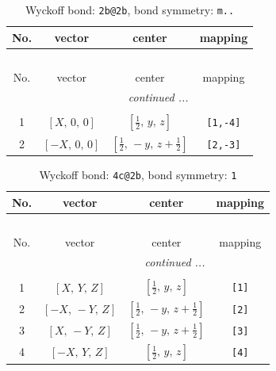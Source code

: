 \documentclass[fleqn,8pt]{jsarticle}
\begin{document}
\renewcommand{\arraystretch}{1.2}
\begin{longtable}{cccc}
\caption{Wyckoff bond: {\tt 2b@2b}, bond symmetry: {\tt m..}}
 \\
 \hline \hline
No. & vector & center & mapping \\ \hline \endfirsthead

\multicolumn{3}{l}{\tablename\ \thetable{}} \\
 \hline \hline
No. & vector & center & mapping \\ \hline \endhead

 \hline \hline
\multicolumn{3}{r}{\footnotesize\it continued ...} \\ \endfoot

 \hline \hline
\multicolumn{3}{r}{} \\ \endlastfoot

1 & $\left[ X,\, 0,\, 0 \right]$ & $\left[ \frac{1}{2},\, y,\, z \right]$ & {\tt [1,-4]} \\ \hline
2 & $\left[ - X,\, 0,\, 0 \right]$ & $\left[ \frac{1}{2},\, - y,\, z + \frac{1}{2} \right]$ & {\tt [2,-3]} \\
\end{longtable}
\renewcommand{\arraystretch}{1.2}
\begin{longtable}{cccc}
\caption{Wyckoff bond: {\tt 4c@2b}, bond symmetry: {\tt 1}}
 \\
 \hline \hline
No. & vector & center & mapping \\ \hline \endfirsthead

\multicolumn{3}{l}{\tablename\ \thetable{}} \\
 \hline \hline
No. & vector & center & mapping \\ \hline \endhead

 \hline \hline
\multicolumn{3}{r}{\footnotesize\it continued ...} \\ \endfoot

 \hline \hline
\multicolumn{3}{r}{} \\ \endlastfoot

1 & $\left[ X,\, Y,\, Z \right]$ & $\left[ \frac{1}{2},\, y,\, z \right]$ & {\tt [1]} \\ \hline
2 & $\left[ - X,\, - Y,\, Z \right]$ & $\left[ \frac{1}{2},\, - y,\, z + \frac{1}{2} \right]$ & {\tt [2]} \\ \hline
3 & $\left[ X,\, - Y,\, Z \right]$ & $\left[ \frac{1}{2},\, - y,\, z + \frac{1}{2} \right]$ & {\tt [3]} \\ \hline
4 & $\left[ - X,\, Y,\, Z \right]$ & $\left[ \frac{1}{2},\, y,\, z \right]$ & {\tt [4]} \\
\end{longtable}
\end{document}
